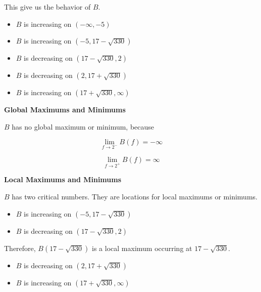 \documentclass{ximera}
\begin{document}
\begin{example}
This give us the behavior of $B$.





\begin{itemize}
  \item $B$ is increasing on $(-\infty, -5)$
  \item $B$ is increasing on $(-5, 17 - \sqrt{330})$
  \item $B$ is decreasing on $(17 - \sqrt{330}, 2)$
  \item $B$ is decreasing on $(2, 17 + \sqrt{330})$
  \item $B$ is increasing on $(17 + \sqrt{330}, \infty)$
\end{itemize}



















\textbf{Global Maximums and Minimums}


$B$ has no global maximum or minimum, because


\[
\lim\limits_{f \to 2^-} B(f) = -\infty 
\]




\[
\lim\limits_{f \to 2^+} B(f) = \infty 
\]





\textbf{Local Maximums and Minimums}


$B$ has two critical numbers.  They are locations for local maximums or minimums.






\begin{itemize}
  \item $B$ is increasing on $(-5, 17 - \sqrt{330})$
  \item $B$ is decreasing on $(17 - \sqrt{330}, 2)$
\end{itemize}


Therefore, $B(17 - \sqrt{330})$ is a local maximum occurring at $17 - \sqrt{330}$.





\begin{itemize}
  \item $B$ is decreasing on $(2, 17 + \sqrt{330})$
  \item $B$ is increasing on $(17 + \sqrt{330}, \infty)$
\end{itemize}




\end{example}
\end{document}
